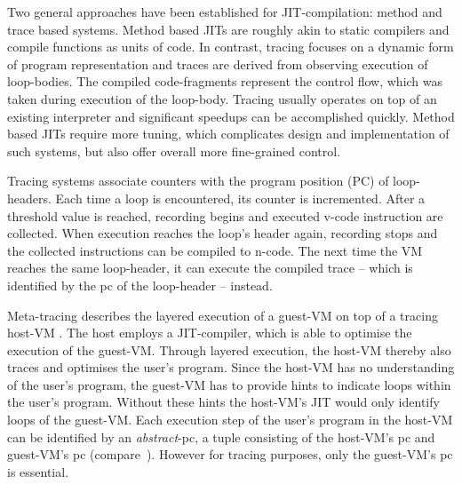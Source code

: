 Two general approaches have been established for JIT-compilation: method and
trace based systems. Method based JITs are roughly akin to static compilers and compile
functions as units of code. In contrast, tracing focuses on a dynamic form of
program representation and traces are derived from observing execution of
loop-bodies. The compiled code-fragments represent the control flow, which was
taken during execution of the loop-body. Tracing usually operates on top of an
existing interpreter and significant speedups can be accomplished quickly.
Method based JITs require more tuning, which complicates design and
implementation of such systems, but also offer overall more fine-grained
control.

Tracing systems associate counters with the program position (PC) of
loop-headers. Each time a loop is encountered, its counter is incremented. After
a threshold value is reached, recording begins and executed v-code instruction
are collected. When execution reaches the loop's header again, recording stops
and the collected instructions can be compiled to n-code. The next time
the VM reaches the same loop-header, it can execute the compiled trace -- which
is identified by the pc of the loop-header -- instead.

Meta-tracing describes the layered execution of a guest-VM on top of a tracing
host-VM . The host employs a JIT-compiler, which is able to optimise the
execution of the guest-VM. Through layered execution, the host-VM thereby also
traces and optimises the user's program. Since the host-VM has no understanding
of the user's program, the guest-VM has to provide hints to indicate loops
within the user's program. Without these hints the host-VM's JIT would only
identify loops of the guest-VM. Each execution step of the user's program in the
host-VM can be identified by an \emph{abstract}-pc, a tuple consisting of the
host-VM's pc and guest-VM's pc (compare~\cite{sullivan2003dynamic}). However for
tracing purposes, only the guest-VM's pc is essential.





